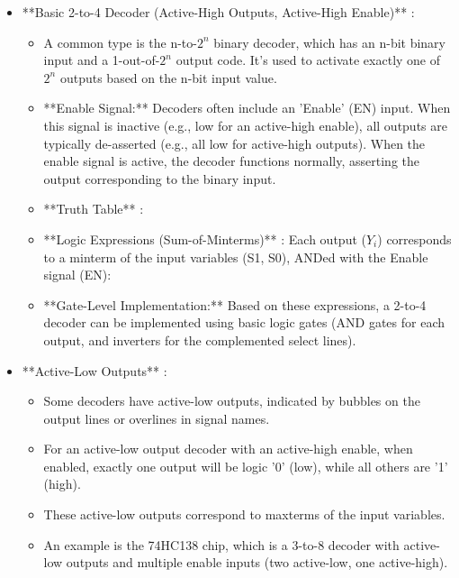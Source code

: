 \documentclass{article}
\begin{document}
\begin{itemize}
    \item **Basic 2-to-4 Decoder (Active-High Outputs, Active-High Enable)** :
    
        \begin{itemize}
            \item A common type is the n-to-$2^n$ binary decoder, which has an n-bit binary input and a 1-out-of-$2^n$ output code. It's used to activate exactly one of $2^n$ outputs based on the n-bit input value.
            \item **Enable Signal:** Decoders often include an 'Enable' (EN) input. When this signal is inactive (e.g., low for an active-high enable), all outputs are typically de-asserted (e.g., all low for active-high outputs). When the enable signal is active, the decoder functions normally, asserting the output corresponding to the binary input.
            \item **Truth Table** :
            \item **Logic Expressions (Sum-of-Minterms)** : Each output ($Y_i$) corresponds to a minterm of the input variables (S1, S0), ANDed with the Enable signal (EN):
            
            \item **Gate-Level Implementation:** Based on these expressions, a 2-to-4 decoder can be implemented using basic logic gates (AND gates for each output, and inverters for the complemented select lines).
        \end{itemize}
    \item **Active-Low Outputs** :
    
        \begin{itemize}
            \item Some decoders have active-low outputs, indicated by bubbles on the output lines or overlines in signal names.
            \item For an active-low output decoder with an active-high enable, when enabled, exactly one output will be logic '0' (low), while all others are '1' (high).
            \item These active-low outputs correspond to maxterms of the input variables.
            \item An example is the 74HC138 chip, which is a 3-to-8 decoder with active-low outputs and multiple enable inputs (two active-low, one active-high).
        \end{itemize}
\end{itemize}
\end{document}
